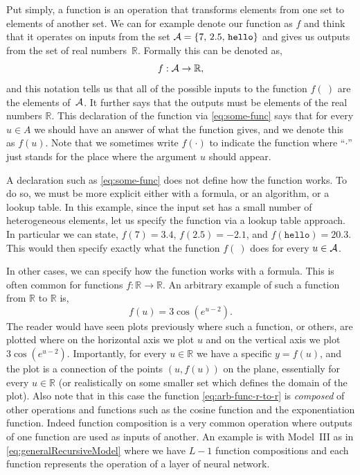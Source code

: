 \documentclass[12pt]{article}
\begin{document}
Put simply, a function is an operation that transforms elements from one set to elements of another set. We can for example denote our function as $f$ and think that it operates on inputs from the set ${\cal A} = \{7,\, 2.5,\, \texttt{hello}\}$ and gives us outputs from the set of real numbers~${\mathbb R}$. Formally this can be denoted as,
%
\begin{equation}
\label{eq:some-func}
f: {\cal A} \to {\mathbb R},
\end{equation}
%
and this notation tells us that all of the possible inputs to the function $f(~)$ are the elements of~${\cal A}$. It further says that the outputs must be elements of the real numbers ${\mathbb R}$. This declaration of the function via \eqref{eq:some-func} says that for every $u \in A$ we should have an answer of what the function gives, and we denote this as $f(u)$. Note that we sometimes write $f(\cdot)$ to indicate the function where ``$\cdot$'' just stands for the place where the argument $u$ should appear. 

A declaration such as \eqref{eq:some-func} does not define how the function works. To do so, we must be more explicit either with a formula, or an algorithm, or a lookup table. In this example, since the input set has a small number of heterogeneous elements, let us specify the function via a lookup table approach. In particular we can state, $f(7) = 3.4$, $f(2.5) = -2.1$, and $f(\texttt{hello}) = 20.3$. This would then specify exactly what the function $f(~)$ does for every $u \in {\cal A}$. 

In other cases, we can specify how the function works with a formula. This is often common for functions $f: {\mathbb R} \to {\mathbb R}$. An arbitrary example of such a function from ${\mathbb R}$ to ${\mathbb R}$ is,
%
\begin{equation}
\label{eq:arb-func-r-to-r}
f(u) = 3\cos(e^{u-2}).
\end{equation}
%
The reader would have seen plots previously where such a function, or others, are plotted where on the horizontal axis we plot $u$ and on the vertical axis we plot $3\cos(e^{u-2})$. Importantly, for every $u \in {\mathbb R}$ we have a specific $y = f(u)$, and the plot is a connection of the points $(u,f(u))$ on the plane, essentially for every $u \in {\mathbb R}$ (or realistically on some smaller set which defines the domain of the plot). Also note that in this case the function \eqref{eq:arb-func-r-to-r} is {\em composed} of other operations and functions such as the cosine function and the exponentiation function. Indeed function composition is a very common operation where outputs of one function are used as inputs of another. An example is with Model~III as in \eqref{eq:generalRecursiveModel} where we have $L-1$ function compositions and each function represents the operation of a layer of neural network.
\end{document}
